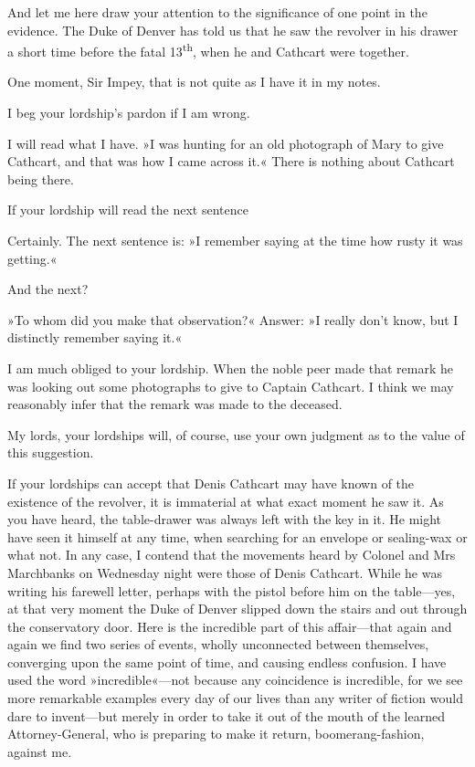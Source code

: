 \begin{dialogue}
And let me here draw your attention to the significance of one point in the evidence. The Duke of Denver has told us that he saw the revolver in his drawer a short time before the fatal 13\textsuperscript{th}, when he and Cathcart were together.


 One moment, Sir Impey, that is not quite as I have it in my notes.

 I beg your lordship's pardon if I am wrong.

 I will read what I have. »I was hunting for an old photograph of Mary to give Cathcart, and that was how I came across it.« There is nothing about Cathcart being there.

 If your lordship will read the next sentence\longdash

 Certainly. The next sentence is: »I remember saying at the time how rusty it was getting.«

 And the next?

 »To whom did you make that observation?« Answer: »I really don't know, but I distinctly remember saying it.«

 I am much obliged to your lordship. When the noble peer made that remark he was looking out some photographs to give to Captain Cathcart. I think we may reasonably infer that the remark was made to the deceased.

  My lords, your lordships will, of course, use your own judgment as to the value of this suggestion.

 If your lordships can accept that Denis Cathcart may have known of the existence of the revolver, it is immaterial at what exact moment he saw it. As you have heard, the table-drawer was always left with the key in it. He might have seen it himself at any time, when searching for an envelope or sealing-wax or what not. In any case, I contend that the movements heard by Colonel and Mrs Marchbanks on Wednesday night were those of Denis Cathcart. While he was writing his farewell letter, perhaps with the pistol before him on the table\allowbreak---\allowbreak yes, at that very moment the Duke of Denver slipped down the stairs and out through the conservatory door. Here is the incredible part of this affair\allowbreak---\allowbreak that again and again we find two series of events, wholly unconnected between themselves, converging upon the same point of time, and causing endless confusion. I have used the word »incredible«---not because any coincidence is incredible, for we see more remarkable examples every day of our lives than any writer of fiction would dare to invent\allowbreak---\allowbreak but merely in order to take it out of the mouth of the learned Attorney-General, who is preparing to make it return, boomerang-fashion, against me. 


\end{dialogue}
